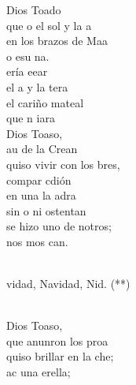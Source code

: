 \documentclass[12pt]{article}
\begin{document}
\begin{multicols*}{2}
\begin{cancion}%
	 Dios Toado \\
	que o el sol y la a\\
	en los brazos de Maa \\
	o esu na.\\
	ería eear \\
	el a y la tera\\
	el cariño mateal \\
	que n  iara\\
	 Dios Toaso,\\
	au de la Crean\\
	quiso vivir con los bres,\\
	compar  cdión\\
	en una la adra \\
	sin o ni ostentan\\
	se hizo uno de notros;\\
	nos mos  can.  \\\jump\\
	\begin{chorus}%
	vidad, Navidad, Nid. (**)\\
	\end{chorus}%
	\jump\\
	 Dios Toaso, \\
	que anunron los proa\\
	quiso brillar en la che; \\
	  ac una erella;\\

\end{cancion}
\end{multicols*}
\end{document}

